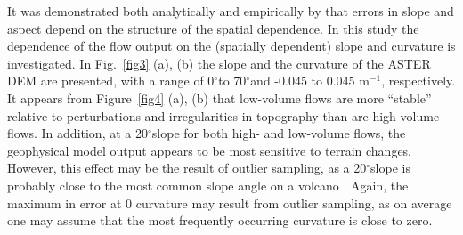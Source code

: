 \documentclass[a4paper,fleqn]{article}
\newcommand{\Deg}{$^{\circ}$}
\begin{document}
It was demonstrated both analytically and empirically by
\citet{Hunter_Goodchild_1997} that errors in slope and aspect depend
on the structure of the spatial dependence. In this study the
dependence of the flow output on the (spatially dependent) slope and
curvature is investigated. In Fig.~\ref{fig3} (a), (b) the slope and
the curvature of the ASTER DEM are presented, with a range of 0\Deg to
70\Deg and -0.045 to 0.045 m$^{-1}$, respectively. It appears from
Figure~\ref{fig4} (a), (b) that low-volume flows are more ``stable''
relative to perturbations and irregularities in topography than are
high-volume flows.  In addition, at a 20\Deg slope for both high- and
low-volume flows, the geophysical model output appears to be most
sensitive to terrain changes.  However, this effect may be the result
of outlier sampling, as a 20\Deg slope is probably close to the most
common slope angle on a volcano \citep{BuPaPi05}.  Again, the maximum
in error at 0 curvature may result from outlier sampling, as on
average one may assume that the most frequently occurring curvature is
close to zero.
\end{document}
